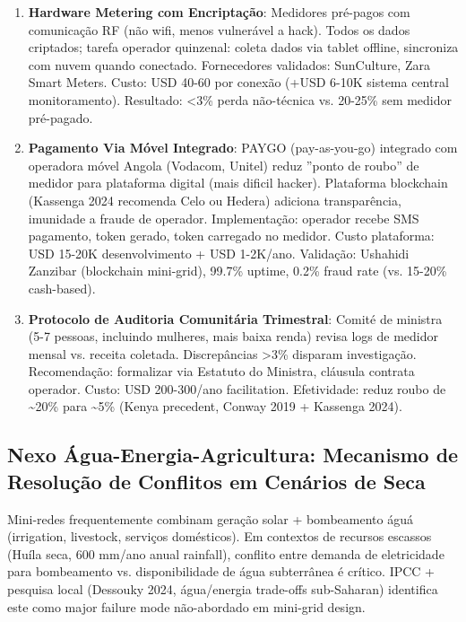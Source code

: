 \documentclass[12pt, a4paper]{article}
\begin{document}
\begin{enumerate}
\item \textbf{Hardware Metering com Encriptação}: Medidores pré-pagos com comunicação RF (não wifi, menos vulnerável a hack). Todos os dados criptados; tarefa operador quinzenal: coleta dados via tablet offline, sincroniza com nuvem quando conectado. Fornecedores validados: SunCulture, Zara Smart Meters. Custo: USD 40-60 por conexão (+USD 6-10K sistema central monitoramento). Resultado: <3\% perda não-técnica vs. 20-25\% sem medidor pré-pagado.

\item \textbf{Pagamento Via Móvel Integrado}: PAYGO (pay-as-you-go) integrado com operadora móvel Angola (Vodacom, Unitel) reduz ''ponto de roubo'' de medidor para plataforma digital (mais dificil hacker). Plataforma blockchain (Kassenga 2024 recomenda Celo ou Hedera) adiciona transparência, imunidade a fraude de operador. Implementação: operador recebe SMS pagamento, token gerado, token carregado no medidor. Custo plataforma: USD 15-20K desenvolvimento + USD 1-2K/ano. Validação: Ushahidi Zanzibar (blockchain mini-grid), 99.7\% uptime, 0.2\% fraud rate (vs. 15-20\% cash-based).

\item \textbf{Protocolo de Auditoria Comunitária Trimestral}: Comité de ministra (5-7 pessoas, incluindo mulheres, mais baixa renda) revisa logs de medidor mensal vs. receita coletada. Discrepâncias >3\% disparam investigação. Recomendação: formalizar via Estatuto do Ministra, cláusula contrata operador. Custo: USD 200-300/ano facilitation. Efetividade: reduz roubo de \textasciitilde{}20\% para \textasciitilde{}5\% (Kenya precedent, Conway 2019 + Kassenga 2024).

\end{enumerate}

\subsection{Nexo Água-Energia-Agricultura: Mecanismo de Resolução de Conflitos em Cenários de Seca}

Mini-redes frequentemente combinam geração solar + bombeamento águá (irrigation, livestock, serviços domésticos). Em contextos de recursos escassos (Huíla seca, 600 mm/ano anual rainfall), conflito entre demanda de eletricidade para bombeamento vs. disponibilidade de água subterrânea é crítico. IPCC + pesquisa local (Dessouky 2024, água/energia trade-offs sub-Saharan) identifica este como major failure mode não-abordado em mini-grid design.
\end{document}
